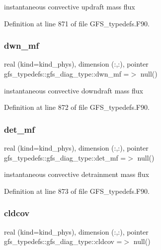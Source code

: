 instantaneous convective updraft mass flux 



Definition at line 871 of file G\+F\+S\+\_\+typedefs.\+F90.

\mbox{\label{structgfs__typedefs_1_1gfs__diag__type_ae7a7a4c9b97d1ed52b554b64f385bba5}} 
\subsubsection{dwn\+\_\+mf}
{\footnotesize\ttfamily real (kind=kind\+\_\+phys), dimension (\+:,\+:), pointer gfs\+\_\+typedefs\+::gfs\+\_\+diag\+\_\+type\+::dwn\+\_\+mf =$>$ null()}



instantaneous convective downdraft mass flux 



Definition at line 872 of file G\+F\+S\+\_\+typedefs.\+F90.

\mbox{\label{structgfs__typedefs_1_1gfs__diag__type_a7c6090a4e12643c065d4f90587d59665}} 
\subsubsection{det\+\_\+mf}
{\footnotesize\ttfamily real (kind=kind\+\_\+phys), dimension (\+:,\+:), pointer gfs\+\_\+typedefs\+::gfs\+\_\+diag\+\_\+type\+::det\+\_\+mf =$>$ null()}



instantaneous convective detrainment mass flux 



Definition at line 873 of file G\+F\+S\+\_\+typedefs.\+F90.

\mbox{\label{structgfs__typedefs_1_1gfs__diag__type_a6cd9a92470c266f39a0b725ebd903898}} 
\subsubsection{cldcov}
{\footnotesize\ttfamily real (kind=kind\+\_\+phys), dimension (\+:,\+:), pointer gfs\+\_\+typedefs\+::gfs\+\_\+diag\+\_\+type\+::cldcov =$>$ null()}



